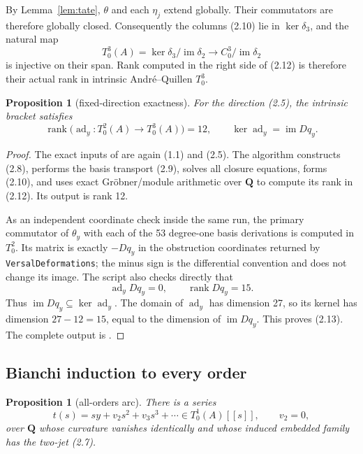 \documentclass[11pt]{article}
\newtheorem{proposition}[theorem]{Proposition}
\theoremstyle{definition}
\theoremstyle{remark}
\newcommand{\QQ}{\mathbf Q}
\newcommand{\im}{\operatorname{im}}
\newcommand{\rank}{\operatorname{rank}}
\newcommand{\ad}{\operatorname{ad}}
\begin{document}
By Lemma~\ref{lem:tate}, $\theta$ and each $\eta_j$ extend globally.  Their
commutators are therefore globally closed.  Consequently the columns (2.10)
lie in $\ker\delta_3$, and the natural map
\[
 T^3_0(A)=\ker\delta_3/\im\delta_2
 \longrightarrow C^3_0/\im\delta_2                             \tag{2.12}
\]
is injective on their span.  Rank computed in the right side of (2.12) is
therefore their actual rank in intrinsic Andr\'e--Quillen $T^3_0$.

\begin{proposition}[fixed-direction exactness]\label{prop:bracket}
For the direction (2.5), the intrinsic bracket satisfies
\[
 \rank\bigl(\ad_y:T^2_0(A)\to T^3_0(A)\bigr)=12,\qquad
 \ker\ad_y=\im Dq_y.                                           \tag{2.13}
\]
\end{proposition}

\begin{proof}
The exact inputs of  are again (1.1) and
(2.5).  The algorithm constructs (2.8), performs the basis transport (2.9),
solves all closure equations, forms (2.10), and uses exact Gr\"obner/module
arithmetic over $\QQ$ to compute its rank in (2.12).  Its output is rank 12.

As an independent coordinate check inside the same run, the primary
commutator of $\theta_y$ with each of the 53 degree-one basis derivations is
computed in $T^2_0$.  Its matrix is exactly $-Dq_y$ in the obstruction
coordinates returned by \texttt{VersalDeformations}; the minus sign is the
differential convention and does not change its image.  The script also
checks directly that
\[
 \ad_yDq_y=0,\qquad \rank Dq_y=15.                              \tag{2.14}
\]
Thus $\im Dq_y\subseteq\ker\ad_y$.  The domain of $\ad_y$ has dimension 27,
so its kernel has dimension $27-12=15$, equal to the dimension of
$\im Dq_y$.  This proves (2.13).  The complete output is
.
\end{proof}

\subsection{Bianchi induction to every order}

\begin{proposition}[all-orders arc]\label{prop:arc}
There is a series
\[
 t(s)=sy+v_2s^2+v_3s^3+\cdots\in T^1_0(A)[[s]],\qquad v_2=0,    \tag{2.15}
\]
over $\QQ$ whose curvature vanishes identically and whose induced embedded
family has the two-jet (2.7).
\end{proposition}
\end{document}
